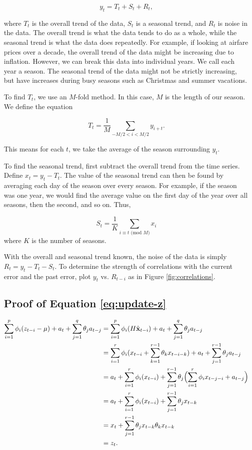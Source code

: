 \begin{equation}
y_t=T_t+S_t+R_t,
\end{equation}

where $T_t$ is the overall trend of the data, $S_t$ is a seasonal trend, and $R_t$ is noise in the data.
The overall trend is what the data tends to do as a whole, while the seasonal trend is what the data does repeatedly.
For example, if looking at airfare prices over a decade, the overall trend of the data might be increasing due to inflation.
However, we can break this data into individual years.
We call each year a season.
The seasonal trend of the data might not be strictly increasing, but have increases during busy seasons such as Christmas and summer vacations.

To find $T_t$, we use an $M$-fold method.
In this case, $M$ is the length of our season.
We define the equation

\begin{equation}
T_t=\frac{1}{M}\sum_{-M/2<i<M/2}y_{i+t}.
\end{equation}

This means for each $t$, we take the average of the season surrounding $y_t$.

To find the seasonal trend, first subtract the overall trend from the time series.
Define $x_t=y_t-T_t$.
The value of the seasonal trend can then be found by averaging each day of the season over every season.
For example, if the season was one year, we would find the average value on the first day of the year over all seasons, then the second, and so on.
Thus,

\begin{equation}
S_t=\frac{1}{K}\sum_{i\equiv t\text{ (mod $M$)}}x_i
\end{equation}
where $K$ is the number of seasons.

With the overall and seasonal trend known, the noise of the data is simply $R_t=y_t-T_t-S_t$.
To determine the strength of correlations with the current error and the past error, plot $y_t$ vs. $R_{t-i}$ as in Figure \ref{fig:correlations}.

\subsection*{Proof of Equation \ref{eq:update-z}}
\begin{align}
    \sum_{i=1}^p\phi_i(z_{t-i}-\mu)+a_t+\sum_{j=1}^q\theta_ja_{t-j}&=\sum_{i=1}^p\phi_i(H\hat{\textbf{x}}_{t-i})+a_t+\sum_{j=1}^q\theta_ja_{t-j}\\
    &=\sum_{i=1}^r\phi_i(x_{t-i}+\sum_{k=1}^{r-1}\theta_kx_{t-i-k})+a_t+\sum_{j=1}^{r-1}\theta_ja_{t-j}\\
    &=a_t+\sum_{i=1}^r\phi_i(x_{t-i})+\sum_{j=1}^{r-1}\theta_j\Bigl(\sum_{i=1}^r\phi_ix_{t-j-i}+a_{t-j}\Bigr)\\
    &=a_t+\sum_{i=1}^r\phi_i(x_{t-i})+\sum_{j=1}^{r-1}\theta_jx_{t-k}\\
    &=x_t+\sum_{j=1}^{r-1}\theta_jx_{t-k}\theta_kx_{t-k}\\
    &=z_t.
\end{align}

